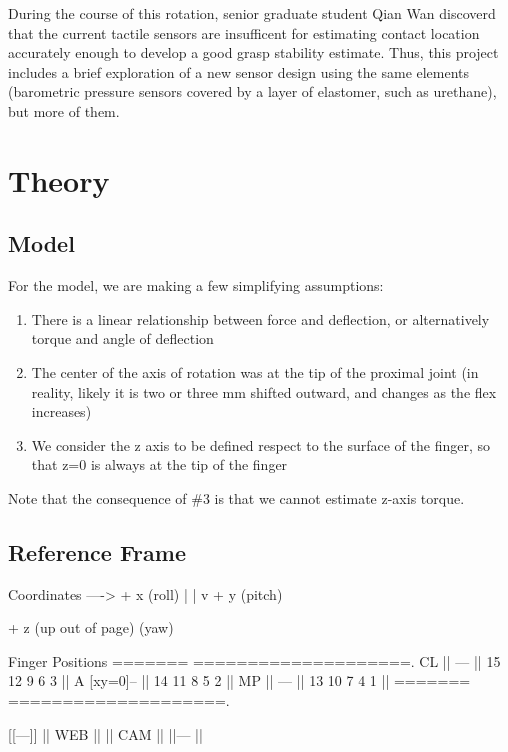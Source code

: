 \documentclass[preprint,12pt,3p]{elsarticle}
\begin{document}
During the course of this rotation, senior graduate student Qian Wan discoverd that the current tactile
sensors are insufficent for estimating contact location accurately enough to develop a good grasp
stability estimate. Thus, this project includes a brief exploration of a new sensor design using the
same elements (barometric pressure sensors covered by a layer of elastomer, such as urethane), but
more of them.

\section{Theory} \label{sec:firstpage}

\subsection{Model}

For the model, we are making a few simplifying assumptions:
 
    \begin{enumerate}
        \item There is a linear relationship between force and deflection, or alternatively torque and angle of deflection
        \item The center of the axis of rotation was at the tip of the proximal joint
    (in reality, likely it is two or three mm shifted outward, and changes as the flex increases)
        \item We consider the z axis to be defined respect to the surface of the finger, so that z=0 is always
    at the tip of the finger
    \end{enumerate}

Note that the consequence of \#3 is that we cannot estimate z-axis torque.

\subsection{Reference Frame}

\begin{ttlisting}[language=C++,breaklines]
Coordinates
----> + x (roll)
|
|
v
+ y (pitch)

+ z (up out of page) (yaw)


Finger Positions
=======      ====================.
 {CL}  || --- || 15  12  9  6  3 ||
 {A} [xy=0]-- || 14  11  8  5  2 ||
 {MP}  || --- || 13  10  7  4  1 ||
=======      ====================.


  [[---]]
||  WEB  ||
||  CAM  ||
  ||--- ||
  
\end{ttlisting}
\end{document}
